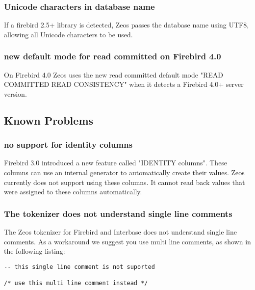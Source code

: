\documentclass[a4paper,12pt,oneside]{book}
\begin{document}
\subsubsection{Unicode characters in database name}
\label{sec:Rev6_FirebirdInterbase_Changes_UnicodeDatabaseName}

If a firebird 2.5+ library is detected, Zeos passes the database name using UTF8, allowing all Unicode characters to be used.

\subsubsection{new default mode for read committed on Firebird 4.0}
\label{sec:Rev6_FirebirdInterbase_Changes_FB4ReadCommitted}

On Firebird 4.0 Zeos uses the new read committed default mode "READ COMMITTED READ CONSISTENCY" when it detects a Firebird 4.0+ server version.

\subsection{Known Problems}
\label{sec:Rev6_FirebirdInterbase_KnownProblems}

\subsubsection{no support for identity columns}
\label{sec:Rev6_FirebirdInterbase_KnownProblems_IdentityColumns}

Firebird 3.0 introduced a new feature called "IDENTITY columns".
These columns can use an internal generator to automatically create their values.
Zeos currently does not support using these columns.
It cannot read back values that were assigned to these columns automatically.

\subsubsection{The tokenizer does not understand single line comments}
\label{sec:Rev6_FirebirdInterbase_KnownProblems_TokenizerSingleLineComments}

The Zeos tokenizer for Firebird and Interbase does not understand single line comments.
As a workaround we suggest you use multi line comments, as shown in the following listing:

\begin{lstlisting}
-- this single line comment is not suported

/* use this multi line comment instead */
\end{lstlisting}
\end{document}
